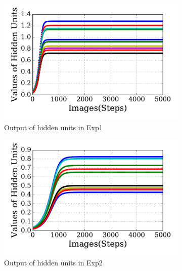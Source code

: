 \begin{figure}
\begin{subfigure}[t]{0.48\textwidth}
		\DIFaddendFL \includegraphics[width=\textwidth]{pics_sdlm/20_exp_AE/exp1_hid_non.pdf}
		\caption{Output of hidden units in Exp1}
	\end{subfigure}
	\DIFdelbeginFL %
\DIFdelendFL \DIFaddbeginFL \begin{subfigure}[t]{0.48\textwidth}
		\DIFaddendFL \includegraphics[width=\textwidth]{pics_sdlm/20_exp_AE/exp2_hid_non.pdf}
		\caption{Output of hidden units in Exp2}
	\end{subfigure}\\
	\DIFdelbeginFL %
\DIFdelendFL \DIFaddbeginFL \begin{subfigure}[t]{0.48\textwidth}

\end{subfigure}
\end{figure}
